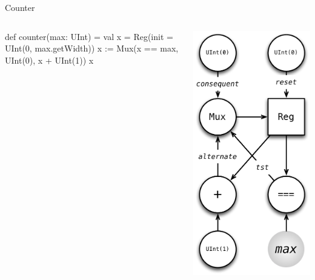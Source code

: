 \documentclass[xcolor=pdflatex,dvipsnames,table]{beamer}
\begin{document}
\begin{frame}[fragile]{Counter}

\begin{columns}

\begin{scala}
def counter(max: UInt) = {
  val x = Reg(init = UInt(0, max.getWidth))
  x := Mux(x == max, UInt(0), x + UInt(1))
  x
}
\end{scala}


\begin{center}
\includegraphics[height=0.9\textheight]{figs/counter.pdf} 
\end{center}

\end{columns}

\end{frame}
\end{document}
